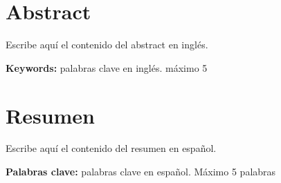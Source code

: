   \clearpage
  \chapter*{Abstract}
  Escribe aquí el contenido del abstract en inglés.

  \vspace{1cm}
  \textbf{Keywords:} palabras clave en inglés. máximo 5

  \clearpage
  \chapter*{Resumen}
  Escribe aquí el contenido del resumen en español.

  \vspace{1cm}
  \textbf{Palabras clave:} palabras clave en español. Máximo 5 palabras
